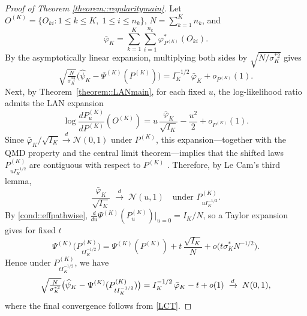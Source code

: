\documentclass[11pt]{article}
\theoremstyle{plain}
\theoremstyle{definition}
\theoremstyle{remark}
\theoremstyle{definition}
\begin{document}
\begin{proof}[Proof of Theorem \ref{theorem::regularitymain}]

 
Let \(O^{(K)}=\{O_{ki}:1\le k\le K,\;1\le i\le n_k\}\), \(N=\sum_{k=1}^K n_k\), and
\[
\bar\varphi_K
=\sum_{k=1}^K\sum_{i=1}^{n_k}\varphi^*_{P^{(K)}}(O_{ki}).
\]
By the asymptotically linear expansion, multiplying both sides by \(\sqrt{N/\sigma_K^{*2}}\) gives
\[
\sqrt{\tfrac{N}{\sigma_K^{*2}}}\bigl(\widehat\psi_K - \Psi^{(K)}(P^{(K)})\bigr)
= I_K^{-1/2}\,\bar\varphi_K + o_{P^{(K)}}(1).
\]
Next, by Theorem~\ref{theorem::LANmain}, for each fixed \(u\), the log-likelihood ratio admits the LAN expansion
\[
\log\frac{dP_u^{(K)}}{dP^{(K)}}(O^{(K)})
= u\,\frac{\bar\varphi_K}{\sqrt{I_K}} - \frac{u^2}{2} + o_{P^{(K)}}(1).
\]
Since \(\bar\varphi_K/\sqrt{I_K} \xrightarrow{d} \mathcal{N}(0,1)\) under \(P^{(K)}\), this expansion---together with the QMD property and the central limit theorem---implies that the shifted laws \(P_{uI_K^{-1/2}}^{(K)}\) are contiguous with respect to \(P^{(K)}\) \citep{van2000asymptotic}. Therefore, by Le Cam’s third lemma,
\[
\frac{\bar\varphi_K}{\sqrt{I_K}} \;\xrightarrow{d}\; \mathcal{N}(u,1)
\quad \text{under } P_{uI_K^{-1/2}}^{(K)}.
\tag{1}\label{LCT}
\]
By \ref{cond::effpathwise}, 
\(\tfrac{d}{du}\Psi^{(K)}(P_u^{(K)})\big|_{u=0}=I_K/N\), 
so a Taylor expansion gives for fixed \(t\)
\[
\Psi^{(K)}\bigl(P_{tI_K^{-1/2}}^{(K)}\bigr)
=\Psi^{(K)}(P^{(K)})+t\,\frac{\sqrt{I_K}}{N}+o\!\bigl(t \sigma_K^* N^{-1/2}\bigr).
\]
Hence under \(P_{tI_K^{-1/2}}^{(K)}\), we have
\[
\sqrt{\tfrac{N}{\sigma_K^{*2}}}\bigl(\widehat\psi_K-\Psi^{(K)}(P_{tI_K^{-1/2}}^{(K)})\bigr)
=I_K^{-1/2}\,\bar\varphi_K - t + o(1)
\;\xrightarrow{d}\;\mathcal \mathcal{N}(0,1),
\]
where the final convergence follows from \eqref{LCT}.  
\end{proof}

 

 

 

 


 
 
\end{document}
